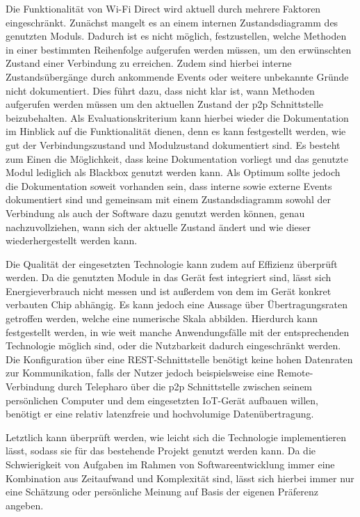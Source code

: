 \documentclass[12pt,a4paper]{article}
\begin{document}
        Die Funktionalität von Wi-Fi Direct wird aktuell durch mehrere Faktoren eingeschränkt. Zunächst mangelt es an einem internen Zustandsdiagramm des genutzten Moduls. Dadurch ist es nicht möglich, festzustellen, welche Methoden in einer bestimmten Reihenfolge aufgerufen werden müssen, um den erwünschten Zustand einer Verbindung zu erreichen. Zudem sind hierbei interne Zustandsübergänge durch ankommende Events oder weitere unbekannte Gründe nicht dokumentiert. Dies führt dazu, dass nicht klar ist, wann Methoden aufgerufen werden müssen um den aktuellen Zustand der p2p Schnittstelle beizubehalten.
        Als Evaluationskriterium kann hierbei wieder die Dokumentation im Hinblick auf die Funktionalität dienen, denn es kann festgestellt werden, wie gut der Verbindungszustand und Modulzustand dokumentiert sind. Es besteht zum Einen die Möglichkeit, dass keine Dokumentation vorliegt und das genutzte Modul lediglich als Blackbox genutzt werden kann. Als Optimum sollte jedoch die Dokumentation soweit vorhanden sein, dass interne sowie externe Events dokumentiert sind und gemeinsam mit einem Zustandsdiagramm sowohl der Verbindung als auch der Software dazu genutzt werden können, genau nachzuvollziehen, wann sich der aktuelle Zustand ändert und wie dieser wiederhergestellt werden kann.
        
        Die Qualität der eingesetzten Technologie kann zudem auf Effizienz überprüft werden. Da die genutzten Module in das Gerät fest integriert sind, lässt sich Energieverbrauch nicht messen und ist außerdem von dem im Gerät konkret verbauten Chip abhängig. Es kann jedoch eine Aussage über Übertragungsraten getroffen werden, welche eine numerische Skala abbilden. Hierdurch kann festgestellt werden, in wie weit manche Anwendungsfälle mit der entsprechenden Technologie möglich sind, oder die Nutzbarkeit dadurch eingeschränkt werden. Die Konfiguration über eine REST-Schnittstelle benötigt keine hohen Datenraten zur Kommunikation, falls der Nutzer jedoch beispielsweise eine Remote-Verbindung durch Telepharo über die p2p Schnittstelle zwischen seinem persönlichen Computer und dem eingesetzten IoT-Gerät aufbauen willen, benötigt er eine relativ latenzfreie und hochvolumige Datenübertragung.
        
        Letztlich kann überprüft werden, wie leicht sich die Technologie implementieren lässt, sodass sie für das bestehende Projekt genutzt werden kann. Da die Schwierigkeit von Aufgaben im Rahmen von Softwareentwicklung immer eine Kombination aus Zeitaufwand und Komplexität sind, lässt sich hierbei immer nur eine Schätzung oder persönliche Meinung auf Basis der eigenen Präferenz angeben.
\end{document}
